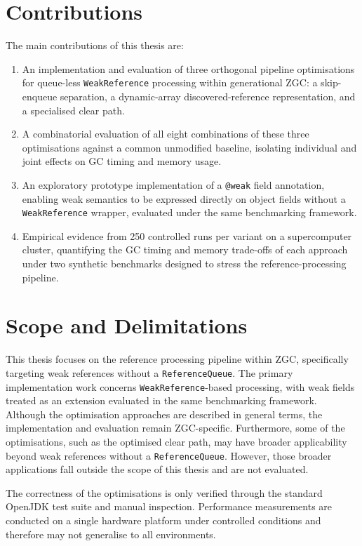     \section{Contributions}
    \label{sec:intro-contributions}
        The main contributions of this thesis are:
        \begin{enumerate}
            \item An implementation and evaluation of three orthogonal pipeline optimisations for queue-less \texttt{WeakReference} processing within generational \ac{ZGC}: a skip-enqueue separation, a dynamic-array discovered-reference representation, and a specialised clear path.
            \item A combinatorial evaluation of all eight combinations of these three optimisations against a common unmodified baseline, isolating individual and joint effects on \ac{GC} timing and memory usage.
            \item An exploratory prototype implementation of a \texttt{@weak} field annotation, enabling weak semantics to be expressed directly on object fields without a \texttt{WeakReference} wrapper, evaluated under the same benchmarking framework.
            \item Empirical evidence from 250 controlled runs per variant on a supercomputer cluster, quantifying the \ac{GC} timing and memory trade-offs of each approach under two synthetic benchmarks designed to stress the reference-processing pipeline.
        \end{enumerate}

    \section{Scope and Delimitations}
    \label{sec:intro-scope}
        This thesis focuses on the reference processing pipeline within \ac{ZGC}, specifically targeting weak references without a \texttt{ReferenceQueue}. The primary implementation work concerns \texttt{WeakReference}-based processing, with weak fields treated as an extension evaluated in the same benchmarking framework. Although the optimisation approaches are described in general terms, the implementation and evaluation remain \ac{ZGC}-specific. Furthermore, some of the optimisations, such as the optimised clear path, may have broader applicability beyond weak references without a \texttt{ReferenceQueue}. However, those broader applications fall outside the scope of this thesis and are not evaluated.

        The correctness of the optimisations is only verified through the standard OpenJDK test suite and manual inspection. Performance measurements are conducted on a single hardware platform under controlled conditions and therefore may not generalise to all environments.

